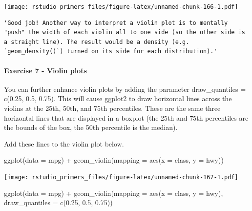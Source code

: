 \documentclass[
]{article}
\newenvironment{Shaded}{\begin{snugshade}}{\end{snugshade}}
\newcommand{\AttributeTok}[1]{\textcolor[rgb]{0.77,0.63,0.00}{#1}}
\newcommand{\FloatTok}[1]{\textcolor[rgb]{0.00,0.00,0.81}{#1}}
\newcommand{\FunctionTok}[1]{\textcolor[rgb]{0.00,0.00,0.00}{#1}}
\newcommand{\NormalTok}[1]{#1}
\newcommand{\SpecialCharTok}[1]{\textcolor[rgb]{0.00,0.00,0.00}{#1}}
\begin{document}
\texttt{[image: rstudio\_primers\_files/figure-latex/unnamed-chunk-166-1.pdf]}

\begin{verbatim}
'Good job! Another way to interpret a violin plot is to mentally "push" the width of each violin all to one side (so the other side is a straight line). The result would be a density (e.g. `geom_density()`) turned on its side for each distribution).'
\end{verbatim}

\hypertarget{exercise-7---violin-plots}{%
\paragraph{Exercise 7 - Violin plots}\label{exercise-7---violin-plots}}

You can further enhance violin plots by adding the parameter
draw\_quantiles = c(0.25, 0.5, 0.75). This will cause ggplot2 to draw
horizontal lines across the violins at the 25th, 50th, and 75th
percentiles. These are the same three horizontal lines that are
displayed in a boxplot (the 25th and 75th percentiles are the bounds of
the box, the 50th percentile is the median).

Add these lines to the violin plot below.

\begin{Shaded}
\begin{Highlighting}[]
\FunctionTok{ggplot}\NormalTok{(}\AttributeTok{data =}\NormalTok{ mpg) }\SpecialCharTok{+}
  \FunctionTok{geom\_violin}\NormalTok{(}\AttributeTok{mapping =} \FunctionTok{aes}\NormalTok{(}\AttributeTok{x =}\NormalTok{ class, }\AttributeTok{y =}\NormalTok{ hwy))}
\end{Highlighting}
\end{Shaded}

\texttt{[image: rstudio\_primers\_files/figure-latex/unnamed-chunk-167-1.pdf]}

\begin{Shaded}
\begin{Highlighting}[]
\FunctionTok{ggplot}\NormalTok{(}\AttributeTok{data =}\NormalTok{ mpg) }\SpecialCharTok{+}
  \FunctionTok{geom\_violin}\NormalTok{(}\AttributeTok{mapping =} \FunctionTok{aes}\NormalTok{(}\AttributeTok{x =}\NormalTok{ class, }\AttributeTok{y =}\NormalTok{ hwy), }\AttributeTok{draw\_quantiles =} \FunctionTok{c}\NormalTok{(}\FloatTok{0.25}\NormalTok{, }\FloatTok{0.5}\NormalTok{, }\FloatTok{0.75}\NormalTok{))}
\end{Highlighting}
\end{Shaded}
\end{document}
